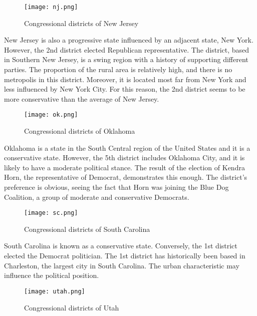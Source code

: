 \documentclass[a4paper, 11pt]{report}
\begin{document}
\begin{itemize}
\begin{figure}[h]
  \begin{center}
    \texttt{[image: nj.png]}
  \end{center}
  \caption{Congressional districts of New Jersey }
  \label{fig:nj}
\end{figure}

\quad New Jersey is also a progressive state influenced by an adjacent state, New York. However, the 2nd district elected Republican representative. The district, based in Southern New Jersey, is a swing region with a history of supporting different parties. The proportion of the rural area is relatively high, and there is no metropolis in this district. Moreover, it is located most far from New York and less influenced by New York City. For this reason, the 2nd district seems to be more conservative than the average of New Jersey.

\begin{figure}[h]
  \begin{center}
    \texttt{[image: ok.png]}
  \end{center}
  \caption{Congressional districts of Oklahoma }
  \label{fig:ok}
\end{figure}

\quad Oklahoma is a state in the South Central region of the United States and it is a conservative state. However, the 5th district includes Oklahoma City, and it is likely to have a moderate political stance. The result of the election of Kendra Horn, the representative of Democrat, demonstrates this enough. The district's preference is obvious, seeing the fact that Horn was joining the Blue Dog Coalition, a group of moderate and conservative Democrats.

\begin{figure}[h]
  \begin{center}
    \texttt{[image: sc.png]}
  \end{center}
  \caption{Congressional districts of South Carolina }
  \label{fig:sc}
\end{figure}

\quad South Carolina is known as a conservative state. Conversely, the 1st district elected the Democrat politician. The 1st district has historically been based in Charleston, the largest city in South Carolina. The urban characteristic may influence the political position.

\begin{figure}[h]
  \begin{center}
    \texttt{[image: utah.png]}
  \end{center}
  \caption{Congressional districts of Utah }
  \label{fig:utah}
\end{figure}


\end{itemize}
\end{document}

